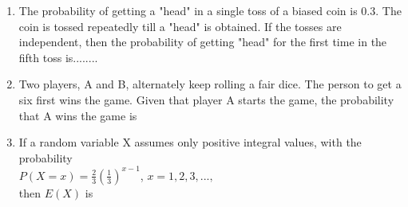 \renewcommand{\theequation}{\theenumi}
\renewcommand{\thefigure}{\theenumi}
\renewcommand{\thetable}{\theenumi}
\begin{enumerate}[label=\thesection.\arabic*.,ref=\thesection.\theenumi]

\item The probability of getting a "head" in a single toss of a biased coin is 0.3. The coin is tossed repeatedly till a "head" is obtained. If the tosses are independent, then the probability of getting "head" for the first time in the fifth toss is........
\solution


\item Two players, A and B, alternately keep rolling a fair dice. The person to get a six first wins the game. Given that player A starts the game, the probability that A wins the game is

\begin{enumerate}
\end{enumerate}
%
\solution


\item If a random variable X assumes only positive integral values, with the probability \\
$
P(X=x) = \frac{2}{3}(\frac{1}{3})^{x-1}$, $x=1,2,3,...,$ \\

then $E(X)$ is

\begin{enumerate}
\end{enumerate}
%
\solution



\end{enumerate}
